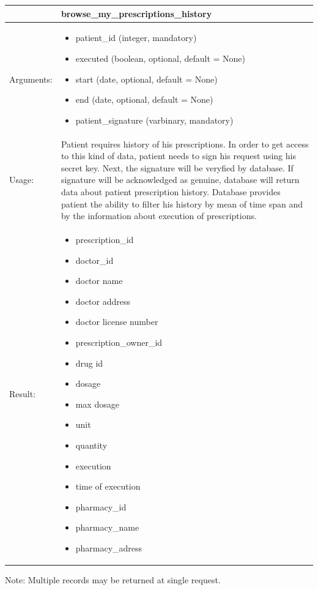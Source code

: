
    \begin{longtable}{| p{6cm} | p{7.75cm} |}
    \hline
     & browse\_my\_prescriptions\_history \\ \hline
    Arguments: &  \begin{itemize}
    	\item patient\_id (integer, mandatory)
		\item executed (boolean, optional, default = None)
		\item start (date, optional, default = None)
		\item end (date, optional, default = None)
		\item patient\_signature (varbinary, mandatory)
	\end{itemize}     \\ \hline
    Usage: & Patient requires history of his prescriptions. In order to get access to this kind of data, patient needs to sign his request using his secret key. Next, the signature will be veryfied by database. If signature will be acknowledged as genuine, database will return data about patient prescription history. Database provides patient the ability to filter his history by mean of time span and by the information about execution of prescriptions. \\ \hline
    Result: & \begin{itemize}
    	\item prescription\_id
    	\item doctor\_id
    	\item doctor name
    	\item doctor address
    	\item doctor license number
    	\item prescription\_owner\_id
    	\item drug id
    	\item dosage
    	\item max dosage
    	\item unit
    	\item quantity
    	\item execution
    	\item time of execution
    	\item pharmacy\_id
    	\item pharmacy\_name
    	\item pharmacy\_adress
	\end{itemize}     \\ \hline	
    \end{longtable}
Note: Multiple records may be returned at single request.

